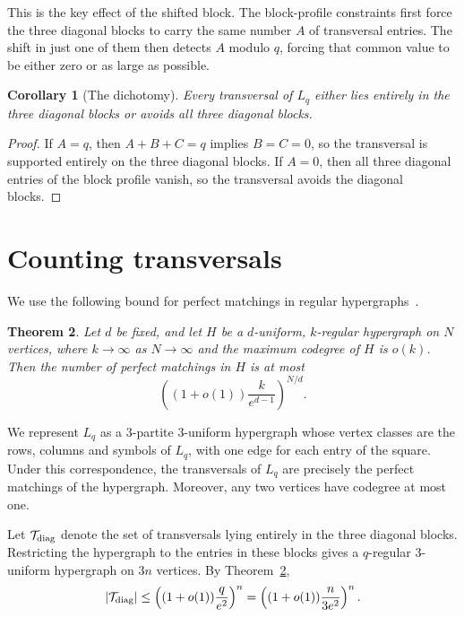 \documentclass[11pt]{article}
\newtheorem{theorem}{Theorem}
\newtheorem{corollary}[theorem]{Corollary}
\theoremstyle{remark}
\newcommand{\1}{\mathbf 1}
\newcommand{\T}{\mathcal T}
\begin{document}
This is the key effect of the shifted block. The block-profile constraints first force the three diagonal blocks to carry the same number $A$ of transversal entries. The shift in just one of them then detects $A$ modulo $q$, forcing that common value to be either zero or as large as possible.

\begin{corollary}[The dichotomy]\label{cor:dichotomy}
Every transversal of $L_q$ either lies entirely in the three diagonal blocks or avoids all three diagonal blocks.
\end{corollary}

\begin{proof}
If $A=q$, then $A+B+C=q$ implies $B=C=0$, so the transversal is supported entirely on the three diagonal blocks. If $A=0$, then all three diagonal entries of the block profile vanish, so the transversal avoids the diagonal blocks.
\end{proof}

\section{Counting transversals}

We use the following bound for perfect matchings in regular hypergraphs~\cite[Theorem~3.1]{LuriaQueens}.

\begin{theorem}\label{thm:matching}
Let $d$ be fixed, and let $H$ be a $d$-uniform, $k$-regular hypergraph on $N$ vertices, where $k\to\infty$ as $N\to\infty$ and the maximum codegree of $H$ is $o(k)$. Then the number of perfect matchings in $H$ is at most
\[
\left((1+o(1))\frac{k}{e^{d-1}}\right)^{N/d}.
\]
\end{theorem}

We represent $L_q$ as a $3$-partite $3$-uniform hypergraph whose vertex classes are the rows, columns and symbols of $L_q$, with one edge for each entry of the square. Under this correspondence, the transversals of $L_q$ are precisely the perfect matchings of the hypergraph. Moreover, any two vertices have codegree at most one.

Let $\T_{\rm diag}$ denote the set of transversals lying entirely in the three diagonal blocks. Restricting the hypergraph to the entries in these blocks gives a $q$-regular $3$-uniform hypergraph on $3n$ vertices. By Theorem~\ref{thm:matching},
\[
|\T_{\rm diag}|
\leq
\left((1+o(1))\frac{q}{e^2}\right)^n
=
\left((1+o(1))\frac{n}{3e^2}\right)^n.
\]
\end{document}
